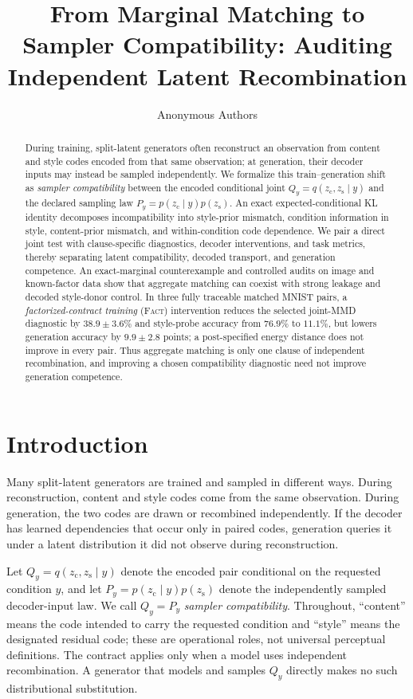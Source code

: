 \documentclass{article}
\title{From Marginal Matching to\\
Sampler Compatibility: Auditing\\
Independent Latent Recombination}
\author{Anonymous Authors}
\newcommand{\zc}{z_{\mathrm{c}}}
\newcommand{\zs}{z_{\mathrm{s}}}
\newcommand{\FACT}{\textsc{Fact}}
\begin{document}
\maketitle

\begin{abstract}
During training, split-latent generators often reconstruct an observation from
content and style codes encoded from that same observation; at generation,
their decoder inputs may instead be sampled independently.  We formalize this
train--generation shift as
\emph{sampler compatibility} between the encoded conditional joint
$Q_y=q(\zc,\zs\mid y)$ and the declared sampling law
$P_y=p(\zc\mid y)p(\zs)$.  An exact expected-conditional KL identity decomposes incompatibility into
style-prior mismatch, condition information in style, content-prior mismatch,
and within-condition code dependence.  We pair a direct joint test with
clause-specific diagnostics, decoder interventions, and task metrics, thereby
separating latent compatibility, decoded transport, and generation competence.
An exact-marginal counterexample and controlled audits on image and known-factor
data show that aggregate matching can coexist with strong leakage and decoded
style-donor control.  In three fully traceable matched MNIST pairs, a
\emph{factorized-contract training} (\FACT{}) intervention reduces the selected
joint-MMD diagnostic by $38.9\!\pm\!3.6\%$ and style-probe accuracy from
$76.9\%$ to $11.1\%$, but lowers generation accuracy by
$9.9\!\pm\!2.8$ points; a post-specified energy distance does not improve in
every pair.  Thus aggregate matching is only one clause of independent
recombination, and improving a chosen compatibility diagnostic need not improve
generation competence.
\end{abstract}

\section{Introduction}
\label{sec:intro}

Many split-latent generators are trained and sampled in different ways.  During
reconstruction, content and style codes come from the same observation.  During
generation, the two codes are drawn or recombined independently.  If the
decoder has learned dependencies that occur only in paired codes, generation
queries it under a latent distribution it did not observe during reconstruction.

Let $Q_y=q(\zc,\zs\mid y)$ denote the encoded pair conditional on the requested
condition $y$, and let $P_y=p(\zc\mid y)p(\zs)$ denote the independently sampled
decoder-input law.  We call $Q_y=P_y$ \emph{sampler compatibility}.  Throughout,
``content'' means the code intended to carry the requested condition and
``style'' means the designated residual code; these are operational roles, not
universal perceptual definitions.  The contract applies only when a model uses
independent recombination.  A generator that models and samples $Q_y$ directly
makes no such distributional substitution.
\end{document}
